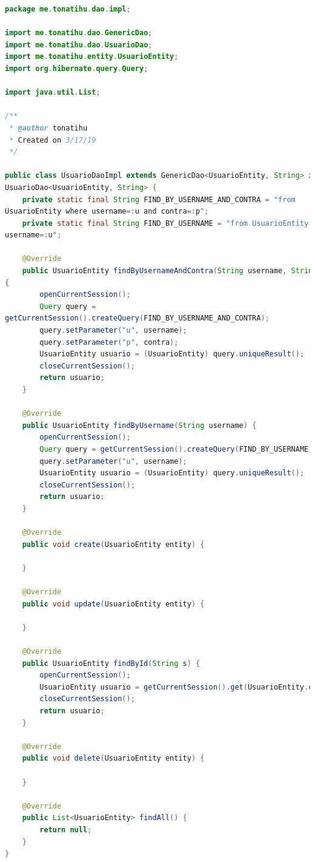 \documentclass[a4paper,12pt]{article}
\begin{document}
\begin{lstlisting}[language=Java, style=customJava, 
caption={UsuarioDaoImpl.java}, captionpos=b,basicstyle=\fontfamily{cmss}\small]
package me.tonatihu.dao.impl;

import me.tonatihu.dao.GenericDao;
import me.tonatihu.dao.UsuarioDao;
import me.tonatihu.entity.UsuarioEntity;
import org.hibernate.query.Query;

import java.util.List;

/**
 * @author tonatihu
 * Created on 3/17/19
 */

public class UsuarioDaoImpl extends GenericDao<UsuarioEntity, String> implements 
UsuarioDao<UsuarioEntity, String> {
    private static final String FIND_BY_USERNAME_AND_CONTRA = "from 
UsuarioEntity where username=:u and contra=:p";
    private static final String FIND_BY_USERNAME = "from UsuarioEntity where 
username=:u";

    @Override
    public UsuarioEntity findByUsernameAndContra(String username, String contra) 
{
        openCurrentSession();
        Query query = 
getCurrentSession().createQuery(FIND_BY_USERNAME_AND_CONTRA);
        query.setParameter("u", username);
        query.setParameter("p", contra);
        UsuarioEntity usuario = (UsuarioEntity) query.uniqueResult();
        closeCurrentSession();
        return usuario;
    }

    @Override
    public UsuarioEntity findByUsername(String username) {
        openCurrentSession();
        Query query = getCurrentSession().createQuery(FIND_BY_USERNAME);
        query.setParameter("u", username);
        UsuarioEntity usuario = (UsuarioEntity) query.uniqueResult();
        closeCurrentSession();
        return usuario;
    }

    @Override
    public void create(UsuarioEntity entity) {

    }

    @Override
    public void update(UsuarioEntity entity) {

    }

    @Override
    public UsuarioEntity findById(String s) {
        openCurrentSession();
        UsuarioEntity usuario = getCurrentSession().get(UsuarioEntity.class, s);
        closeCurrentSession();
        return usuario;
    }

    @Override
    public void delete(UsuarioEntity entity) {

    }

    @Override
    public List<UsuarioEntity> findAll() {
        return null;
    }
}
\end{lstlisting}
\end{document}
